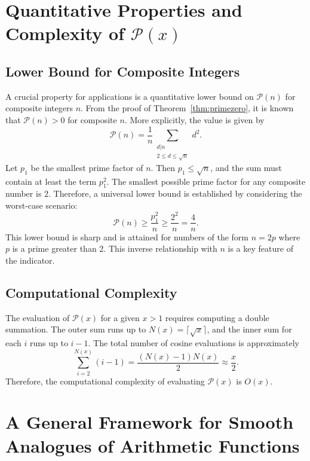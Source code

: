 \documentclass[11pt,a4paper]{amsart}
\newcommand{\Px}{\mathcal{P}}
\theoremstyle{plain}
\theoremstyle{definition}
\begin{document}
\section{Quantitative Properties and Complexity of $\Px(x)$}

\subsection{Lower Bound for Composite Integers}
A crucial property for applications is a quantitative lower bound on $\Px(n)$ for composite integers $n$.
From the proof of Theorem~\ref{thm:primezero}, it is known that $\Px(n)>0$ for composite $n$.
More explicitly, the value is given by
\[ \Px(n) = \frac{1}{n} \sum_{\substack{d|n \\ 2 \le d \le \sqrt{n}}} d^2.
\]
Let $p_1$ be the smallest prime factor of $n$. Then $p_1 \le \sqrt{n}$, and the sum must contain at least the term $p_1^2$.
The smallest possible prime factor for any composite number is 2. Therefore, a universal lower bound is established by considering the worst-case scenario:
\[ \Px(n) \ge \frac{p_1^2}{n} \ge \frac{2^2}{n} = \frac{4}{n}.
\]
This lower bound is sharp and is attained for numbers of the form $n=2p$ where $p$ is a prime greater than 2. This inverse relationship with $n$ is a key feature of the indicator.
\subsection{Computational Complexity}
The evaluation of $\Px(x)$ for a given $x>1$ requires computing a double summation.
The outer sum runs up to $N(x) = \lceil\sqrt{x}\rceil$, and the inner sum for each $i$ runs up to $i-1$.
The total number of cosine evaluations is approximately
\[ \sum_{i=2}^{N(x)} (i-1) = \frac{(N(x)-1)N(x)}{2} \approx \frac{x}{2}.
\]
Therefore, the computational complexity of evaluating $\Px(x)$ is $O(x)$.

\section{A General Framework for Smooth Analogues of Arithmetic Functions}
\end{document}
